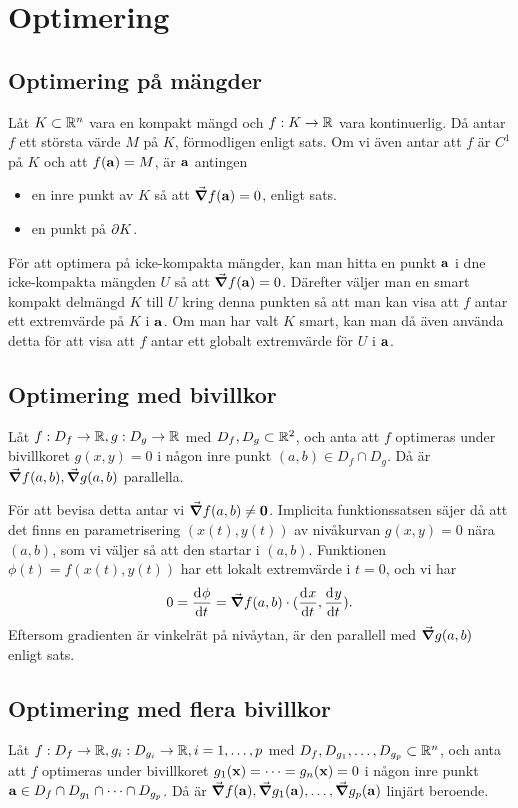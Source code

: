 \section{Optimering}

\subsection{Optimering på mängder}

Låt $K\subset\mathbb{R}^n$ vara en kompakt mängd och $f: K\to\mathbb{R}$ vara kontinuerlig. Då antar $f$ ett största värde $M$ på $K$, förmodligen enligt sats. Om vi även antar att $f$ är $C^1$ på $K$ och att $f(\vect{a}) = M$, är $\vect{a}$ antingen
\begin{itemize}
	\item en inre punkt av $K$ så att $\grad{f} (\vect{a}) = 0$, enligt sats.
	\item en punkt på $\partial K$.
\end{itemize}

För att optimera på icke-kompakta mängder, kan man hitta en punkt $\vect{a}$ i dne icke-kompakta mängden $U$ så att $\grad{f} (\vect{a}) = 0$. Därefter väljer man en smart kompakt delmängd $K$ till $U$ kring denna punkten så att man kan visa att $f$ antar ett extremvärde på $K$ i $\vect{a}$. Om man har valt $K$ smart, kan man då även använda detta för att visa att $f$ antar ett globalt extremvärde för $U$ i $\vect{a}$.

\subsection{Optimering med bivillkor}
Låt $f:D_f\to\mathbb{R}, g:D_g\to\mathbb{R}$ med $D_f, D_g\subset\mathbb{R}^2$, och anta att $f$ optimeras under bivillkoret $g(x, y) = 0$ i någon inre punkt $(a, b)\in D_f\cap D_g$. Då är $\grad{f} (a, b), \grad{g} (a, b)$ parallella.

För att bevisa detta antar vi $\grad{f} (a, b)\neq\vect{0}$. Implicita funktionssatsen säjer då att det finns en parametrisering $(x(t), y(t))$ av nivåkurvan $g(x, y) = 0$ nära $(a, b)$, som vi väljer så att den startar i $(a, b)$. Funktionen $\phi (t) = f(x(t), y(t))$ har ett lokalt extremvärde i $t = 0$, och vi har
\begin{align*}
	0 = \dv[]{\phi}{t} (0) = \grad{f} (a, b)\cdot (\dv[]{x}{t} (0), \dv[]{y}{t} (0)).
\end{align*}
Eftersom gradienten är vinkelrät på nivåytan, är den parallell med $\grad{g} (a, b)$ enligt sats.

\subsection{Optimering med flera bivillkor}
Låt $f:D_f\to\mathbb{R}, g_i: D_{g_i}\to\mathbb{R}, i = 1, \dots, p$ med $D_f, D_{g_1}, \dots, D_{g_p}\subset\mathbb{R}^n$, och anta att $f$ optimeras under bivillkoret $g_1(\vect{x}) = \dots = g_n(\vect{x}) = 0$ i någon inre punkt $\vect{a}\in D_f\cap D_{g_1} \cap\dots\cap D_{g_p}$. Då är $\grad{f} (\vect{a}), \grad{g_1} (\vect{a}), \dots, \grad{g_p} (\vect{a})$ linjärt beroende.

